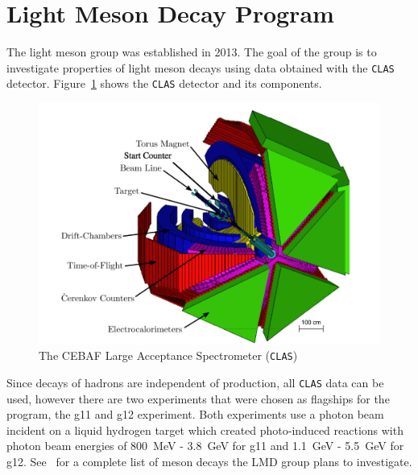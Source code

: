 \documentclass{aip-cp}
\begin{document}
\section{Light Meson Decay Program}
The light meson group was established in 2013. The goal of the group is to investigate properties of light meson decays using data obtained with the \textsc{\texttt{CLAS}} detector. Figure~\ref{fig:clas} shows the \textsc{\texttt{CLAS}} detector and its components.
\begin{figure}[h]
	\centerline{\includegraphics[width=175 pt]{figures/clas_schematicIII.pdf}}
	\caption{The CEBAF Large Acceptance Spectrometer (\textsc{\texttt{CLAS}}) }
	\label{fig:clas}
\end{figure}
 Since decays of hadrons are independent of production, all \textsc{\texttt{CLAS}} data can be used, however there are two experiments that were chosen as flagships for the program, the g11 and g12 experiment. Both experiments use a photon beam incident on a liquid hydrogen target which created photo-induced reactions with photon beam energies of 800~MeV - 3.8~GeV for g11 and 1.1~GeV - 5.5~GeV for g12.  See~\cite{lmdCAA} for a complete list of meson decays the LMD group plans to investigate.
%
\end{document}
